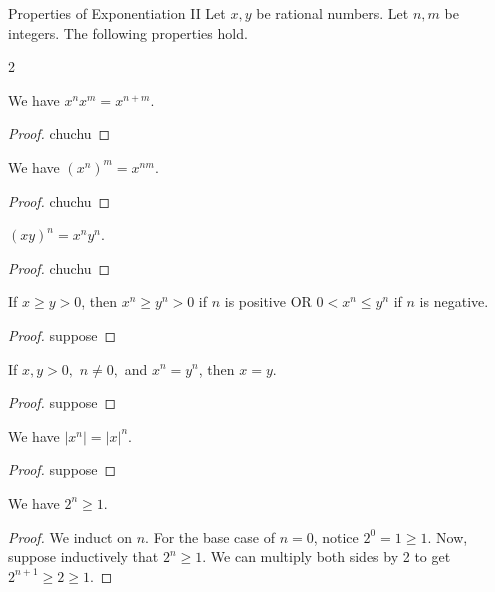 \begin{problem}{Properties of Exponentiation II}
Let $x, y$ be rational numbers. Let $n, m$ be integers. The following properties hold.
\end{problem}

\begin{multicols}{2}
\begin{proposition} We have $x^n x^m = x^{n + m}$.
\end{proposition}
\begin{proof}
    chuchu
\end{proof}

\begin{proposition} We have $(x^n)^m=x^{nm}.$
\end{proposition}
\begin{proof}
    chuchu
\end{proof}

\begin{proposition} $(xy)^n=x^n y^n.$
\end{proposition}
\begin{proof}
    chuchu
\end{proof}

\begin{proposition}
    If $x \geq y > 0$, then $x^n \geq y^n > 0$ if $n$ is positive OR $0 < x^n \leq y^n$ if $n$ is negative.
\end{proposition}
\begin{proof}
    suppose
\end{proof}

\begin{proposition}
    If $x, y > 0,$ $n \neq 0,$ and $x^n = y^n$, then $x = y$.
\end{proposition}
\begin{proof}
    suppose
\end{proof}

\begin{proposition}
    We have $\lvert x^n \rvert = \lvert x \rvert ^n$.
\end{proposition}
\begin{proof}
    suppose
\end{proof}
\end{multicols}

\begin{lemma}\label{lem: two_to_the_n}
    We have $2^n \geq 1.$
\end{lemma}
\begin{proof}
    We induct on $n$. For the base case of $n = 0$, notice $2^0 = 1 \geq 1.$
    Now, suppose inductively that $2^n \geq 1.$ We can multiply both sides by 2 to get $2^{n+1} \geq 2 \geq 1.$
\end{proof}

